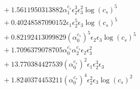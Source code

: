 \documentclass[10pt]{article}
\begin{document}
\begin{align*}
&{}  + 1.5611950313882 \alpha_{1}^{c_s} \epsilon_{2}^{3} \epsilon_{3}^{2} \log{\left(c_{s} \right)}^{5} \\
&{}  + 0.40248587090152 \epsilon_{1} \epsilon_{2}^{5} \epsilon_{3} \log{\left(c_{s} \right)}^{5} \\
&{}  + 0.82192413099829 \left(\alpha_{0}^{c_s}\right)^{5} \epsilon_{2} \epsilon_{3} \log{\left(c_{s} \right)}^{5} \\
&{}  + 1.7096379078705 \alpha_{0}^{c_s} \alpha_{2}^{c_s} \epsilon_{2} \epsilon_{3}^{2} \\
&{}  + 13.770384427539 \left(\alpha_{0}^{c_s}\right)^{2} \epsilon_{1} \epsilon_{2}^{3} \epsilon_{3} \\
&{}  + 1.8240374453211 \left(\alpha_{0}^{c_s}\right)^{4} \epsilon_{2}^{2} \epsilon_{3} \log{\left(c_{s} \right)}^{2}
\end{align*}
\end{document}
